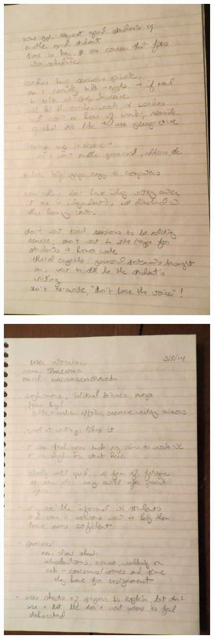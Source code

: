 \documentclass[12pt]{article} %
\begin{document}
  \begin{figure}[H]
  \centering
  \includegraphics[width=0.75\linewidth]{RAZ_raw_notes7}
  \caption{}
  \label{fig:rn7}
  \end{figure}
  \begin{figure}[H]
  \centering
  \includegraphics[width=0.75\linewidth]{RAZ_raw_notes8}
  \caption{}
  \label{fig:rn8}
  \end{figure}
\end{document}
